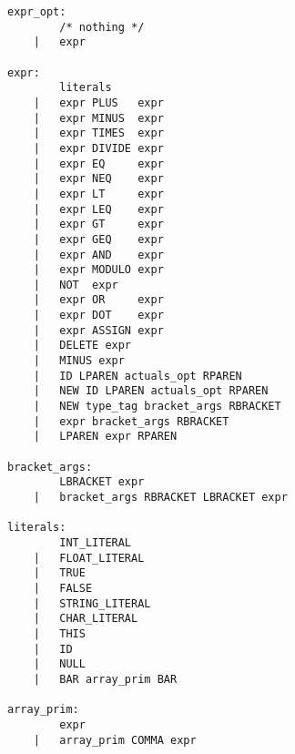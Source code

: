 \begin{verbatim}
expr_opt:
		/* nothing */
	| 	expr

expr:
		literals		 				
	| 	expr PLUS   expr 				
	| 	expr MINUS  expr 				
	| 	expr TIMES  expr 				
	| 	expr DIVIDE expr 				
	| 	expr EQ     expr 				
	| 	expr NEQ    expr 				
	| 	expr LT     expr 				
	| 	expr LEQ    expr 				
	| 	expr GT     expr 				
	| 	expr GEQ    expr 				
	| 	expr AND    expr 				
	| 	expr MODULO expr 				
	| 	NOT  expr 						
	| 	expr OR     expr 				
	| 	expr DOT    expr 				
	| 	expr ASSIGN expr 				
	| 	DELETE expr 					
	|   MINUS expr 						
	| 	ID LPAREN actuals_opt RPAREN 	
	| 	NEW ID LPAREN actuals_opt RPAREN 
	|	NEW type_tag bracket_args RBRACKET 
	| 	expr bracket_args RBRACKET		 
	| 	LPAREN expr RPAREN 				

bracket_args:
		LBRACKET expr
	| 	bracket_args RBRACKET LBRACKET expr

literals:
		INT_LITERAL     
	| 	FLOAT_LITERAL   
	| 	TRUE			  
	| 	FALSE			  
	| 	STRING_LITERAL  
	| 	CHAR_LITERAL
	| 	THIS 			  
	| 	ID 			   		
	| 	NULL
	| 	BAR array_prim BAR 

array_prim:
		expr
	|	array_prim COMMA expr
\end{verbatim}	